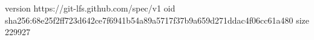version https://git-lfs.github.com/spec/v1
oid sha256:68e25f2ff723d642ce7f6941b54a89a5717f37b9a659d271ddac4f06cc61a480
size 229927
